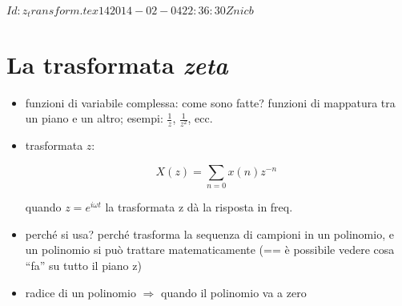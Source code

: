 %
%

\svnInfo $Id: z_transform.tex 14 2014-02-04 22:36:30Z nicb $

\chapter{La trasformata \emph{zeta}}

\begin{itemize}

  \item funzioni di variabile complessa: come sono fatte?
    funzioni di mappatura tra un piano e un altro;
    esempi: $\frac{1}{z}$, $\frac{1}{z^2}$, ecc.

  \item trasformata $z$:
	
		 \begin{equation}
	      X ( z ) = \sum_{n = 0}{x(n) z^{-n}}\
		 \end{equation}
		 
    quando $z = e^{i \omega t}$ la trasformata z d\`a la risposta in freq.

  \item perch\'e si usa? perch\'e trasforma la sequenza di campioni in
    un polinomio, e un polinomio si pu\`o trattare matematicamente
    (== \`e possibile vedere cosa ``fa'' su tutto il piano z)

  \item radice di un polinomio $\Rightarrow$ quando il polinomio va a zero


\end{itemize}
